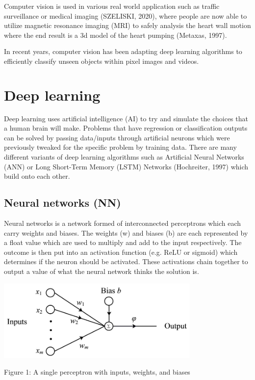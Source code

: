 \documentclass[12pt]{report}
\begin{document}
\vspace{2mm}

Computer vision is used in various real world application such as traffic surveillance or medical imaging (SZELISKI, 2020), where people are now able to utilize magnetic resonance imaging (MRI) to safely analysis the heart wall motion where the end result is a 3d model of the heart pumping (Metaxas, 1997). 

\vspace{2mm}

In recent years, computer vision has been adapting deep learning algorithms to efficiently classify unseen objects within pixel images and videos. 


\section{Deep learning}

Deep learning uses artificial intelligence (AI) to try and simulate the choices that a human brain will make. Problems that have regression or classification outputs can be solved by passing data/inputs through artificial neurons which were previously tweaked for the specific problem by training data. There are many different variants of deep learning algorithms such as Artificial Neural Networks (ANN) or Long Short-Term Memory (LSTM) Networks (Hochreiter, 1997) which build onto each other.

\subsection{Neural networks (NN)}

Neural networks is a network formed of interconnected perceptrons which each carry weights and biases. The weights (w) and biases (b) are each represented by a float value which are used to multiply and add to the input respectively. The outcome is then put into an activation function (e.g. ReLU or sigmoid) which determines if the neuron should be activated. These activations chain together to output a value of what the neural network thinks the solution is. 

\vspace{5 mm}

\begin{centering}
	
\includegraphics[width=100mm]{./images/weights and biases.png}

{Figure 1: A single perceptron with inputs, weights, and biases}

\end{centering}
\end{document}
